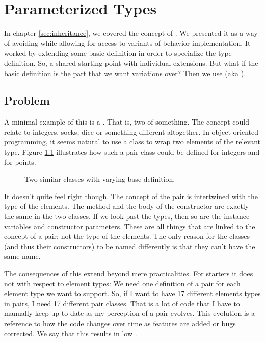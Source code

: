 \chapter{Parameterized Types}

In chapter \ref{sec:inheritance}, we covered the concept of . We presented it as a way of avoiding  while allowing for  access to variants of behavior implementation. It worked by extending some basic definition in order to specialize the type definition. So, a shared starting point with individual extensions. But what if the basic definition is the part that we want variations over? Then we use  (aka ).

\section{Problem}

A minimal example of this is a . That is, two of something. The concept could relate to integers, socks, dice or something different altogether. In object-oriented programming, it seems natural to use a class to wrap two elements of the relevant type. Figure \ref{fig:generics:pair:problem} illustrates how such a pair class could be defined for integers and for points.

\begin{figure}[tbp]
  
  \caption{Two similar classes with varying base definition.}
  \label{fig:generics:pair:problem}
\end{figure}

It doesn't quite feel right though. The concept of the pair is intertwined with the type of the elements. The  method and the body of the constructor are exactly the same in the two classes. If we look past the types, then so are the instance variables and constructor parameters. These are all things that are linked to the concept of a pair; not the type of the elements. The only reason for the classes (and thus their constructors) to be named differently is that they can't have the same name.

The consequences of this extend beyond mere practicalities. For starters it does not  with respect to element types: We need one definition of a pair for each element type we want to support. So, if I want to have 17 different elements types in pairs, I need 17 different pair classes. That is a lot of code that I have to manually keep up to date as my perception of a pair evolves. This evolution is a reference to how the code changes over time as features are added or bugs corrected. We say that this results in low .

